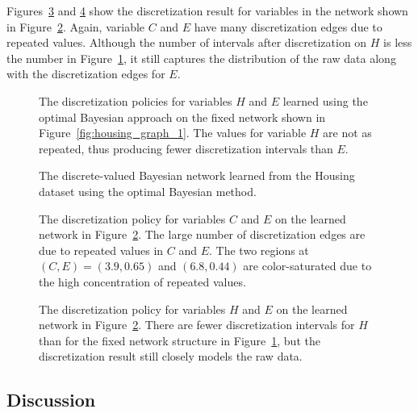 Figures~\ref{fig:housing_exp2_distr_3_5} and \ref{fig:housing_exp2_distr_8_5} show the discretization result for variables in the network shown in Figure~\ref{fig:housing_graph_2}.
Again, variable $C$ and $E$ have many discretization edges due to repeated values.
Although the number of intervals after discretization on $H$ is less the number in Figure~\ref{fig:housing_exp1_distr_8_5}, it still captures the distribution of the raw data along with the discretization edges for $E$.

\begin{figure}[H]
  \centering
  
  \caption{
    The discretization policies for variables $H$ and $E$ learned using the optimal Bayesian approach on the fixed network shown in Figure~\ref{fig:housing_graph_1}.
    The values for variable $H$ are not as repeated, thus producing fewer discretization intervals than $E$.
  }
  \label{fig:housing_exp1_distr_8_5}
\end{figure}

\begin{figure}[H]
  \centering
  \scalebox{0.8}{}
  \caption{
    The discrete-valued Bayesian network learned from the Housing dataset using the optimal Bayesian method.
  }
  \label{fig:housing_graph_2}
\end{figure}

\begin{figure}[H]
  \centering
  
  \caption{
    The discretization policy for variables $C$ and $E$ on the learned network in Figure~\ref{fig:housing_graph_2}.
    The large number of discretization edges are due to repeated values in $C$ and $E$.
    The two regions at $(C,E) = (3.9,0.65)$ and $(6.8,0.44)$ are color-saturated due to the high concentration of repeated values.
  }
  \label{fig:housing_exp2_distr_3_5}
\end{figure}

\begin{figure}[H]
  \centering
  
  \caption{
    The discretization policy for variables $H$ and $E$ on the learned network in Figure~\ref{fig:housing_graph_2}.
    There are fewer discretization intervals for $H$ than for the fixed network structure in Figure~\ref{fig:housing_exp1_distr_8_5}, but the discretization result still closely models the raw data.
  }
  \label{fig:housing_exp2_distr_8_5}
\end{figure}

\subsection{Discussion}
\label{subsec:discuss_exp}

